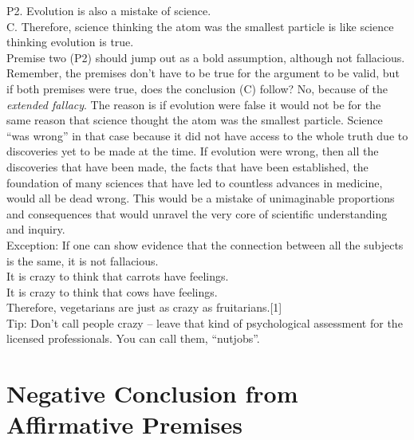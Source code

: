 \documentclass[a4paper,12pt,single,pdftex]{scrbook}
\begin{document}
    
      P2. Evolution is also a mistake of science.
    \\

    
      C. Therefore, science thinking the atom was the smallest particle is like science thinking evolution is true.
    \\

    
      Premise two (P2) should jump out as a bold assumption, although not fallacious.  Remember, the premises don’t have to be true for the argument to be valid, but if both premises were true, does the conclusion (C) follow?  No, because of the {\it extended fallacy}.  The reason is if evolution were false it would not be for the same reason that science thought the atom was the smallest particle.  Science “was wrong” in that case because it did not have access to the whole truth due to discoveries yet to be made at the time.  If evolution were wrong, then all the discoveries that have been made, the facts that have been established, the foundation of many sciences that have led to countless advances in medicine, would all be dead wrong.  This would be a mistake of unimaginable proportions and consequences that would unravel the very core of scientific understanding and inquiry.
    \\

    
      Exception: If one can show evidence that the connection between all the subjects is the same, it is not fallacious.
    \\

    
      It is crazy to think that carrots have feelings.
    \\

    
      It is crazy to think that cows have feelings.
    \\

    
      Therefore, vegetarians are just as crazy as fruitarians.[1]
    \\

    
      Tip: Don’t call people crazy -- leave that kind of psychological assessment for the licensed professionals.  You can call them, “nutjobs”.
    \\

    \chapter{
      Negative Conclusion from Affirmative Premises
    }
  
    

    
      
\end{document}

